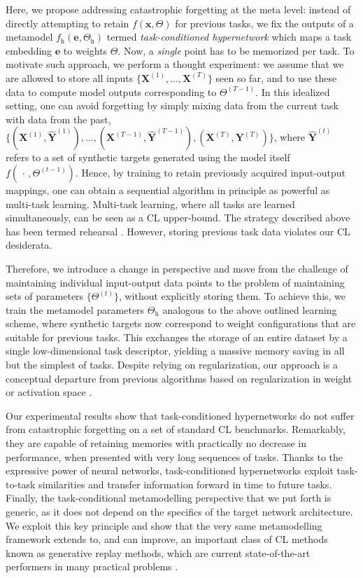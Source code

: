 \documentclass{article}
\begin{document}
Here, we propose addressing catastrophic forgetting at the meta level: instead of directly attempting to retain $f(\mathbf{x}, \Theta)$ for previous tasks, we fix the outputs of a metamodel $f_\text{h}(\mathbf{e}, \Theta_\text{h})$ termed \emph{task-conditioned hypernetwork} which maps a task embedding $\mathbf{e}$ to weights $\Theta$. Now, a \emph{single} point has to be memorized per task. To motivate such approach, we perform a thought experiment: we assume that we are allowed to store all inputs $\{ \mathbf{X}^{(1)}, \dots, \mathbf{X}^{(T)} \}$ seen so far, and to use these data to compute model outputs corresponding to $\Theta^{(T-1)}$. In this idealized setting, one can avoid forgetting by simply mixing data from the current task with data from the past, $\{ (\mathbf{X}^{(1)}, \hat{\mathbf{Y}}^{(1)}), \dots, (\mathbf{X}^{(T-1)}, \hat{\mathbf{Y}}^{(T-1)}), (\mathbf{X}^{(T)}, \mathbf{Y}^{(T)}) \}$, where $\hat{\mathbf{Y}}^{(t)}$ refers to a set of synthetic targets generated using the model itself $f(\, \cdot \,, \Theta^{(t-1)})$. Hence, by training to retain previously acquired input-output mappings, one can obtain a sequential algorithm in principle as powerful as multi-task learning. Multi-task learning, where all tasks are learned simultaneously, can be seen as a CL upper-bound. The strategy described above has been termed rehearsal \citep{robins_catastrophic_1995}. However, storing previous task data violates our CL desiderata.

Therefore, we introduce a change in perspective and move from the challenge of maintaining individual input-output data points to the problem of maintaining sets of parameters $\{\Theta^{(t)}\}$, without explicitly storing them. To achieve this, we train the metamodel parameters $\Theta_\text{h}$ analogous to the above outlined learning scheme, where synthetic targets now correspond to weight configurations that are suitable for previous tasks. This exchanges the storage of an entire dataset by a single low-dimensional task descriptor, yielding a massive memory saving in all but the simplest of tasks. Despite relying on regularization, our approach is a conceptual departure from previous algorithms based on regularization in weight \citep[e.g.,][]{kirkpatrick_overcoming_2017,zenke_continual_2017} or activation space \citep[e.g.,][]{he_overcoming_2017}.

Our experimental results show that task-conditioned hypernetworks do not suffer from catastrophic forgetting on a set of standard CL benchmarks. Remarkably, they are capable of retaining memories with practically no decrease in performance, when presented with very long sequences of tasks. Thanks to the expressive power of neural networks, task-conditioned hypernetworks exploit task-to-task similarities and transfer information forward in time to future tasks. Finally, the task-conditional metamodelling perspective that we put forth is generic, as it does not depend on the specifics of the target network architecture. We exploit this key principle and show that the very same metamodelling framework extends to, and can improve, an important class of CL methods known as generative replay methods, which are current state-of-the-art performers in many practical problems \citep{shin_continual_2017,wu_memory_2018,van_de_ven_generative_2018}.
\end{document}
